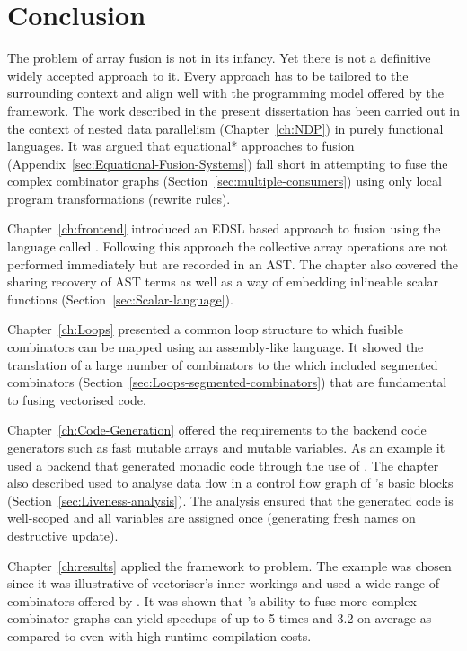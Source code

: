 \documentclass[preamble.tex]{subfiles}
\begin{document}
\clearpage

\chapter{Conclusion}

The problem of array fusion is not in its infancy. Yet there is not a definitive widely accepted approach to it. Every approach has to be tailored to the surrounding context and align well with the programming model offered by the framework. The work described in the present dissertation has been carried out in the context of nested data parallelism (Chapter~\ref{ch:NDP}) in purely functional languages. It was argued that \*equational* approaches to fusion (Appendix~\ref{sec:Equational-Fusion-Systems}) fall short in attempting to fuse the complex combinator graphs (Section~\ref{sec:multiple-consumers}) using only local program transformations (rewrite rules).

Chapter~\ref{ch:frontend} introduced an EDSL based approach to fusion using the language called \LiveFusion. Following this approach the collective array operations are not performed immediately but are recorded in an AST. The chapter also covered the sharing recovery of AST terms as well as a way of embedding inlineable scalar functions (Section~\ref{sec:Scalar-language}).

Chapter~\ref{ch:Loops} presented a common loop structure to which fusible combinators can be mapped using an assembly-like \Loop language. It showed the translation of a large number of combinators to the \Loop which included segmented combinators (Section~\ref{sec:Loops-segmented-combinators}) that are fundamental to fusing vectorised code.

Chapter~\ref{ch:Code-Generation} offered the requirements to the backend code generators such as fast mutable arrays and mutable variables. As an example it used a backend that generated monadic \Haskell code through the use of . The chapter also described  used to analyse data flow in a control flow graph of \Loop's basic blocks (Section~\ref{sec:Liveness-analysis}). The analysis ensured that the generated code is well-scoped and all variables are assigned once (generating fresh names on destructive update).

Chapter~\ref{ch:results} applied the \LiveFusion framework to \QuickHull problem. The example was chosen since it was illustrative of \DPH vectoriser's inner workings and used a wide range of combinators offered by \LiveFusion. It was shown that \LiveFusion's ability to fuse more complex combinator graphs can yield speedups of up to 5 times and 3.2 on average as compared to \StreamFusion even with high runtime compilation costs.
\end{document}
